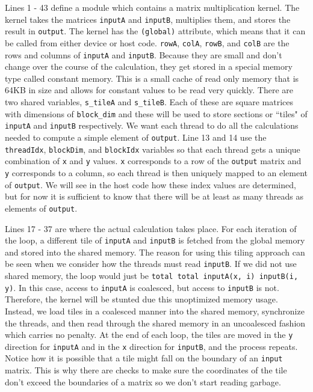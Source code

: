 Lines 1 - 43 define a module which contains a matrix multiplication kernel. The kernel takes the matrices \texttt{inputA} and \texttt{inputB}, multiplies them, and stores the result in \texttt{output}. The kernel has the \texttt{{\color{myblue}{attributes}}(global)} attribute, which means that it can be called from either device or host code. \texttt{rowA}, \texttt{colA}, \texttt{rowB}, and \texttt{colB} are the rows and columns of \texttt{inputA} and \texttt{inputB}. Because they are small and don't change over the course of the calculation, they get stored in a special memory type called constant memory. This is a small cache of read only memory that is 64KB in size and allows for constant values to be read very quickly. There are two shared variables, \texttt{s\_tileA} and \texttt{s\_tileB}. Each of these are square matrices with dimensions of \texttt{block\_dim} and these will be used to store sections or ``tiles" of \texttt{inputA} and \texttt{inputB} respectively. We want each thread to do all the calculations needed to compute a simple element of \texttt{output}. Line 13 and 14 use the \texttt{threadIdx}, \texttt{blockDim}, and \texttt{blockIdx} variables so that each thread gets a unique combination of \texttt{x} and \texttt{y} values. \texttt{x} corresponds to a row of the \texttt{output} matrix and \texttt{y} corresponds to a column, so each thread is then uniquely mapped to an element of \texttt{output}. We will see in the host code how these index values are determined, but for now it is sufficient to know that there will be at least as many threads as elements of \texttt{output}.

Lines 17 - 37 are where the actual calculation takes place. For each iteration of the loop, a different tile of \texttt{inputA} and \texttt{inputB} is fetched from the global memory and stored into the shared memory. The reason for using this tiling approach can be seen when we consider how the threads must read \texttt{inputB}. If we did not use shared memory, the loop would just be \texttt{total {\color{myyellow}{=}} total {\color{myyellow}{+}} inputA(x, i) {\color{myyellow}{*}} inputB(i, y)}. In this case, access to \texttt{inputA} is coalesced, but access to \texttt{inputB} is not. Therefore, the kernel will be stunted due this unoptimized memory usage. Instead, we load tiles in a coalesced manner into the shared memory, synchronize the threads, and then read through the shared memory in an uncoalesced fashion which carries no penalty. At the end of each loop, the tiles are moved in the \texttt{y} direction for \texttt{inputA} and in the \texttt{x} direction for \texttt{inputB}, and the process repeats. Notice how it is possible that a tile might fall on the boundary of an \texttt{input} matrix. This is why there are checks to make sure the coordinates of the tile don't exceed the boundaries of a matrix so we don't start reading garbage.

